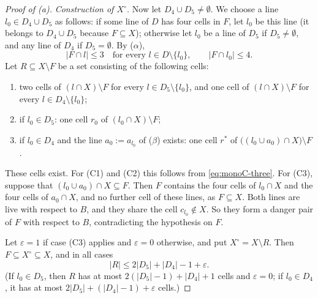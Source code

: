 \begin{proof}[Proof of \textup{(a)}]
\smallskip\noindent\emph{Construction of $X^\circ$.}
Now let $D_4\cup D_5\ne\emptyset$. We choose a line $l_0\in D_4\cup D_5$ as follows: if some line of $D$
has four cells in $F$, let $l_0$ be this line (it belongs to $D_4\cup D_5$ because $F\subseteq X$);
otherwise let $l_0$ be a line of $D_5$ if $D_5\ne\emptyset$, and any line of $D_4$ if $D_5=\emptyset$. By
($\alpha$),
\begin{equation}\label{eq:monoC-three}
  |F\cap l|\le 3\quad\text{for every } l\in D\setminus\{l_0\},\qquad |F\cap l_0|\le 4 .
\end{equation}
Let $R\subseteq X\setminus F$ be a set consisting of the following cells:
\begin{enumerate}[label=\textup{(C\arabic*)}]
\item two cells of $(l\cap X)\setminus F$ for every $l\in D_5\setminus\{l_0\}$, and one cell of
      $(l\cap X)\setminus F$ for every $l\in D_4\setminus\{l_0\}$;
\item if $l_0\in D_5$: one cell $r_0$ of $(l_0\cap X)\setminus F$;
\item if $l_0\in D_4$ and the line $a_0:=a_{l_0}$ of \textup{($\beta$)} exists: one cell $r^*$ of
      $\bigl((l_0\cup a_0)\cap X\bigr)\setminus F$.
\end{enumerate}
These cells exist. For (C1) and (C2) this follows from \eqref{eq:monoC-three}. For (C3), suppose that
$(l_0\cup a_0)\cap X\subseteq F$. Then $F$ contains the four cells of $l_0\cap X$ and the four cells of
$a_0\cap X$, and no further cell of these lines, as $F\subseteq X$. Both lines are live with respect to
$B$, and they share the cell $c_{l_0}\notin X$. So they form a danger pair of $F$ with respect to $B$,
contradicting the hypothesis on $F$.

Let $\varepsilon=1$ if case (C3) applies and $\varepsilon=0$ otherwise, and put $X^\circ=X\setminus R$. Then
$F\subseteq X^\circ\subseteq X$, and in all cases
\begin{equation}\label{eq:monoC-R}
  |R|\le 2|D_5|+|D_4|-1+\varepsilon .
\end{equation}
(If $l_0\in D_5$, then $R$ has at most $2(|D_5|-1)+|D_4|+1$ cells and $\varepsilon=0$; if $l_0\in D_4$, it
has at most $2|D_5|+(|D_4|-1)+\varepsilon$ cells.)


\end{proof}
